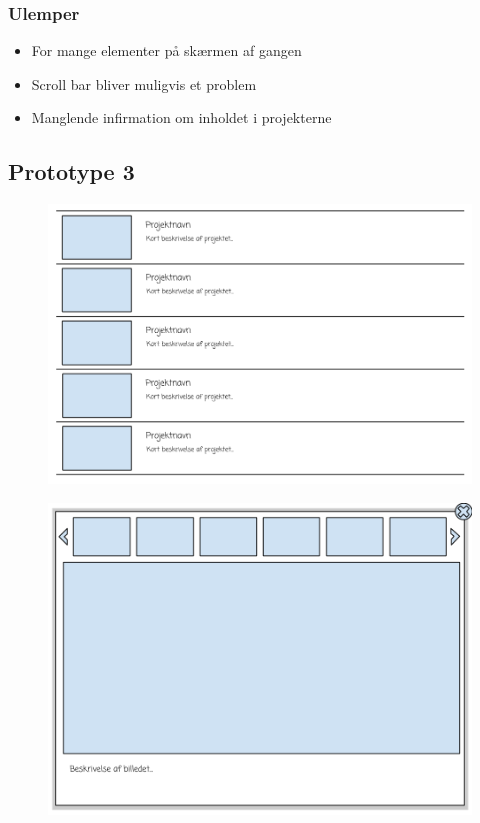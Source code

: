 \documentclass[a4paper,titlepage,fleqn,12pt]{article}
\begin{document}
\subsubsection{Ulemper}
\begin{itemize}
\item For mange elementer på skærmen af gangen
\item Scroll bar bliver muligvis et problem
\item Manglende infirmation om inholdet i projekterne
\end{itemize}

\subsection{Prototype 3}

\begin{figure}[H]
\includegraphics[width=\textwidth]{Sketch2_1.png}
\end{figure}

\begin{figure}[H]
\includegraphics[width=\textwidth]{Sketch2_2.png}
\end{figure}
\end{document}
